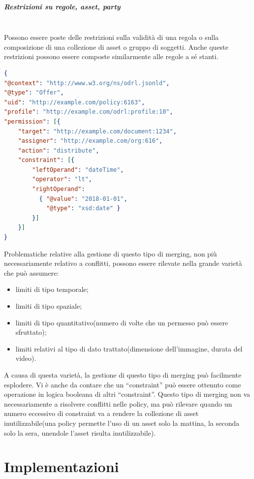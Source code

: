 \documentclass[12pt,a4paper,twoside]{book}
\begin{document}
\paragraph{Restrizioni su regole, asset, party}\mbox{}\\
Possono essere poste delle restrizioni sulla validità di una regola o sulla composizione di una collezione di asset o gruppo di soggetti. Anche queste restrizioni possono essere composte similarmente alle regole a sé stanti.\newpage
\begin{lstlisting}[language=json,firstnumber=1,caption={Esempio di limite temporale per una regola, può essere composto similarmente ai limiti sull'azione regolata},captionpos=b]
{
"@context": "http://www.w3.org/ns/odrl.jsonld",
"@type": "Offer",
"uid": "http://example.com/policy:6163",
"profile": "http://example.com/odrl:profile:10",
"permission": [{
	"target": "http://example.com/document:1234",
	"assigner": "http://example.com/org:616",
	"action": "distribute",
	"constraint": [{
		"leftOperand": "dateTime",
		"operator": "lt",
		"rightOperand": 
		  { "@value": "2018-01-01",
		    "@type": "xsd:date" }
		}]
	}]
}
\end{lstlisting}
Problematiche relative alla gestione di questo tipo di merging, non più necessariamente relativo a conflitti, possono essere rilevate nella grande varietà che può assumere:
\begin{itemize}
	\item limiti di tipo temporale;
	\item limiti di tipo spaziale;
	\item limiti di tipo quantitativo(numero di volte che un permesso può essere sfruttato);
	\item limiti relativi al tipo di dato trattato(dimensione dell'immagine, durata del video).
\end{itemize}
A causa di questa varietà, la gestione di questo tipo di merging può facilmente esplodere. Vi è anche da contare che un ``constraint'' può essere ottenuto come operazione in logica booleana di altri ``constraint''. Questo tipo di merging non va necessariamente a risolvere conflitti nelle policy, ma può rilevare quando un numero eccessivo di constraint va a rendere la collezione di asset inutilizzabile(una policy permette l'uso di un asset solo la mattina, la seconda solo la sera, unendole l'asset risulta inutilizzabile).

\chapter{Implementazioni}\label{implementazioniCh}
\end{document}
